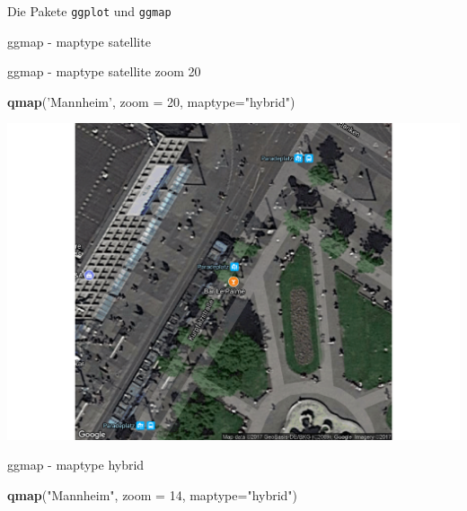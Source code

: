 \documentclass[ignorenonframetext,]{beamer}
\newenvironment{Shaded}{}{}
\newcommand{\KeywordTok}[1]{\textcolor[rgb]{0.00,0.44,0.13}{\textbf{{#1}}}}
\newcommand{\DataTypeTok}[1]{\textcolor[rgb]{0.56,0.13,0.00}{{#1}}}
\newcommand{\DecValTok}[1]{\textcolor[rgb]{0.25,0.63,0.44}{{#1}}}
\newcommand{\StringTok}[1]{\textcolor[rgb]{0.25,0.44,0.63}{{#1}}}
\newcommand{\NormalTok}[1]{{#1}}
\begin{document}
\begin{frame}[fragile]{Die Pakete \texttt{ggplot} und \texttt{ggmap}}
\begin{block}{ggmap - maptype satellite}
\end{block}

\begin{block}{ggmap - maptype satellite zoom 20}

\begin{Shaded}
\begin{Highlighting}[]
\KeywordTok{qmap}\NormalTok{(}\StringTok{'Mannheim'}\NormalTok{, }\DataTypeTok{zoom =} \DecValTok{20}\NormalTok{, }\DataTypeTok{maptype=}\StringTok{"hybrid"}\NormalTok{)}
\end{Highlighting}
\end{Shaded}

\includegraphics{R_intern_files/figure-beamer/unnamed-chunk-263-1.pdf}

\end{block}

\begin{block}{ggmap - maptype hybrid}

\begin{Shaded}
\begin{Highlighting}[]
\KeywordTok{qmap}\NormalTok{(}\StringTok{"Mannheim"}\NormalTok{, }\DataTypeTok{zoom =} \DecValTok{14}\NormalTok{, }\DataTypeTok{maptype=}\StringTok{"hybrid"}\NormalTok{)}
\end{Highlighting}
\end{Shaded}


\end{block}
\end{frame}
\end{document}
